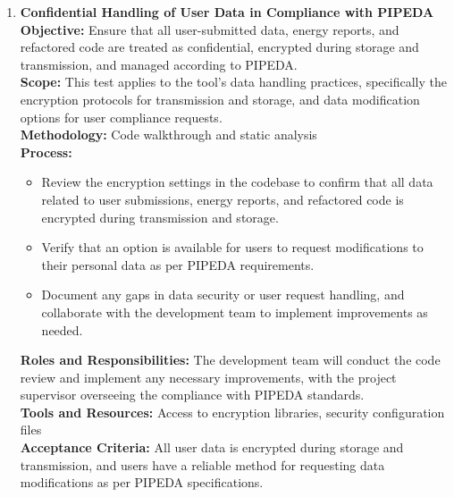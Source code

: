 \documentclass[12pt, titlepage]{article}
\begin{document}
\begin{enumerate}[label={\bf \textcolor{Maroon}{test-SRT-\arabic*}}, wide=0pt, font=\itshape]
  \item \textbf{Confidential Handling of User Data in Compliance with PIPEDA} \\[2mm]
    \textbf{Objective:} Ensure that all user-submitted data, energy reports, and refactored code are treated as confidential, encrypted during storage and transmission, and managed according to PIPEDA. \\[2mm]
    \textbf{Scope:} This test applies to the tool’s data handling practices, specifically the encryption protocols for transmission and storage, and data modification options for user compliance requests. \\[2mm]
    \textbf{Methodology:} Code walkthrough and static analysis \\[2mm]
    \textbf{Process:}
    \begin{itemize}
      \item Review the encryption settings in the codebase to confirm that all data related to user submissions, energy reports, and refactored code is encrypted during transmission and storage.
      \item Verify that an option is available for users to request modifications to their personal data as per PIPEDA requirements.
      \item Document any gaps in data security or user request handling, and collaborate with the development team to implement improvements as needed.
    \end{itemize}
    \textbf{Roles and Responsibilities:} The development team will conduct the code review and implement any necessary improvements, with the project supervisor overseeing the compliance with PIPEDA standards. \\[2mm]
    \textbf{Tools and Resources:} Access to encryption libraries, security configuration files \\[2mm]
    \textbf{Acceptance Criteria:} All user data is encrypted during storage and transmission, and users have a reliable method for requesting data modifications as per PIPEDA specifications.


\end{enumerate}
\end{document}
